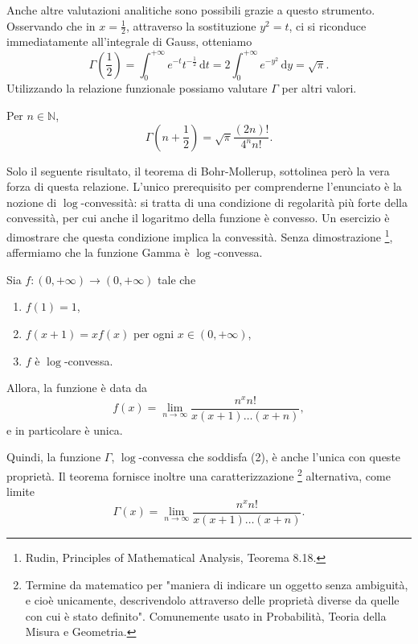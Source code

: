 Anche altre valutazioni analitiche sono possibili grazie a questo strumento. 
Osservando che in $x= \frac{1}{2}$, attraverso la sostituzione $y^2=t$, ci si riconduce immediatamente all'integrale di Gauss, otteniamo 
\begin{equation*}
	\Gamma \left( \frac{1}{2} \right)= \int_{0}^{+ \infty}e^{-t}t^{- \frac{1}{2}} \, \mathrm{d}t=2 \int_{0}^{+ \infty}e^{-y^2} \, \mathrm{d}y= \sqrt{ \pi}.
\end{equation*} 
Utilizzando la relazione funzionale possiamo valutare $ \Gamma$ per altri valori.
\begin{Lem} Per $n \in \mathbb{N}$,
	\begin{equation*}
		\Gamma \left(n+ \frac{1}{2} \right) = 
		\sqrt{ \pi} \frac{(2n)!}{4^n n!}.
	\end{equation*}
\end{Lem}

Solo il seguente risultato, il teorema di Bohr-Mollerup, sottolinea però la vera forza di questa relazione. 
L'unico prerequisito per comprenderne l'enunciato è la nozione di $ \log$-convessità: si tratta di una condizione di regolarità più forte della convessità, per cui anche il logaritmo della funzione è convesso. 
Un esercizio è dimostrare che questa condizione implica la convessità. 
Senza dimostrazione \footnote{Rudin, Principles of Mathematical Analysis, Teorema 8.18.}, affermiamo che la funzione Gamma è $ \log$-convessa.

\begin{The}
Sia $f:(0,+ \infty) \to(0,+ \infty)$ tale che
\begin{enumerate}
	\item $f(1)=1$,
	\item $f(x+1)=xf(x)$ per ogni $x \in (0,+ \infty)$,
	\item $f$ è $ \log$-convessa.
\end{enumerate}
Allora, la funzione è data da
\begin{equation*}
f(x) = 
\lim_{n \to \infty} \frac{n^x n!}{x(x+1) \dots(x+n)},	
\end{equation*}
e in particolare è unica.
\end{The}
Quindi, la funzione $ \Gamma$, $ \log$-convessa che soddisfa (2), è anche l'unica con queste proprietà. 
Il teorema fornisce inoltre una caratterizzazione \footnote{Termine da matematico per "maniera di indicare un oggetto senza ambiguità, e cioè unicamente, descrivendolo attraverso delle proprietà diverse da quelle con cui è stato definito". 
Comunemente usato in Probabilità, Teoria della Misura e Geometria.} alternativa, come limite
\begin{equation*}
	\Gamma(x) = 
	\lim_{n \to \infty} \frac{n^x n!}{x(x+1) \dots(x+n)}.	
\end{equation*}

\pagebreak